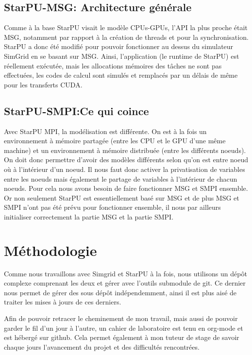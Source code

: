 \documentclass[smallextended]{svjour3}
\begin{document}
\subsection{StarPU-MSG: Architecture générale}
\label{sec-3-2}
Comme à la base StarPU visait le modèle CPUs-GPUs, l'API la plus
proche était MSG, notamment par rapport à la création de threads et
pour la synchronisation. StarPU a donc été modifié pour pouvoir
fonctionner au dessus du simulateur SimGrid en se basant sur
MSG. Ainsi, l'application (le runtime de StarPU) est réellement
exécutée, mais les allocations mémoires des tâches ne sont pas
effectuées, les codes de calcul sont simulés et remplacés par un
délais de même pour les transferts CUDA. 


\subsection{StarPU-SMPI:Ce qui coince}
\label{sec-3-3}
Avec StarPU MPI, la modélisation est différente. On est à la fois
un environnement à mémoire partagée (entre les CPU et le GPU
d'une même machine) et un environnement à mémoire distribuée
(entre les différents noeuds). On doit donc permettre d'avoir des
modèles différents selon qu'on est entre noeud où à l'intérieur
d'un noeud. Il nous faut donc activer la privatisation de variables
entre les noeuds mais également le partage de variables à
l'intérieur de chacun noeuds. Pour cela nous avons besoin de faire
fonctionner MSG et SMPI ensemble. Or non seulement StarPU est
essentiellement basé sur MSG et de plus MSG et SMPI n'ont pas été
prévu pour fonctionner ensemble, il nous par ailleurs initialiser
correctement la partie MSG et la partie SMPI.

\section{Méthodologie}
\label{sec-4}
Comme nous travaillons avec Simgrid et StarPU à la fois, nous
utilisons un dépôt complexe comprenant les deux et gérer avec
l'outils submodule de git. Ce dernier nous permet de gérer des sous
dépôt indépendemment, ainsi il est plus aisé de traiter les mises à
jours de ces derniers.

Afin de pouvoir retracer le cheminement de mon travail, mais aussi
de pouvoir garder le fil d'un jour à l'autre, un cahier de
laboratoire est tenu en org-mode et est hébergé sur github. Cela permet
également à mon tuteur de stage de savoir chaque jours l'avancement
du projet et des difficultés rencontrées.
\end{document}
